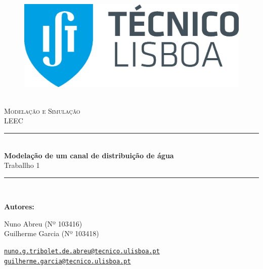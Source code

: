 \documentclass[12pt]{article}
\newcommand{\HRule}{\rule{\linewidth}{0.5mm}} %
\begin{document}
\begin{center}
    \begin{figure}
        \vspace{1.0cm}
        \includegraphics[scale = 0.3, center]{Imagens/IST_A.eps} %
    \end{figure}
    \mbox{}\\[2.0cm]
    \textsc{\Huge Modelação e Simulação}\\[2.5cm]
    \textsc{\LARGE LEEC}\\[2.0cm]
    \HRule\\[0.4cm]
    {\large \bf {\selectfont Modelação de um canal de distribuição de água}\\[0.2cm]}
    {\large {Traballho 1}}
    \HRule\\[1.5cm]
\end{center}

\begin{flushleft}
    \textbf{\selectfont Autores:}
\end{flushleft}

\begin{center}
    \begin{minipage}{0.4\textwidth}
        \begin{flushleft}
        Nuno Abreu (Nº 103416)\\
        Guilherme Garcia (Nº 103418)\\
            
        \end{flushleft}
    \end{minipage}%
    \begin{minipage}{0.6\textwidth}
        \begin{flushright}
            \href{mailto:nuno.g.tribolet.de.abreu@tecnico.ulisboa.pt}{\texttt{nuno.g.tribolet.de.abreu@tecnico.ulisboa.pt}}\\
            \href{mailto:guilherme.garcia@tecnico.ulisboa.pt}{\texttt{guilherme.garcia@tecnico.ulisboa.pt}}\\
        \end{flushright}
    \end{minipage}
\end{center}
    
\end{document}
